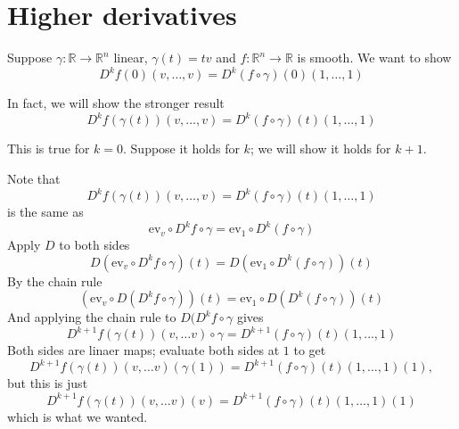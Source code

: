 \documentclass[12pt]{article}
\newcommand{\R}{\mathbb{R}}
\begin{document}
\section*{Higher derivatives}

Suppose $\gamma : \R \to \R^n$ linear, $\gamma(t) = tv$ and $f : \R^n
\to \R$ is smooth.  We want to show
$$
D^k f (0)(v,\ldots,v) = D^k (f \circ \gamma)(0)(1,\ldots,1)
$$

In fact, we will show the stronger result
$$
D^k f (\gamma(t))(v,\ldots,v) = D^k (f \circ \gamma)(t)(1,\ldots,1)
$$

This is true for $k = 0$.  Suppose it holds for $k$; we will show it
holds for $k+1$.

Note that
$$
D^k f (\gamma(t))(v,\ldots,v) = D^k (f \circ \gamma)(t)(1,\ldots,1)
$$
is the same as
$$
\mbox{ev}_v \circ D^k f \circ \gamma = \mbox{ev}_1 \circ D^k (f \circ \gamma)
$$
Apply $D$ to both sides
$$
D(\mbox{ev}_v \circ D^k f \circ \gamma)(t) = D(\mbox{ev}_1 \circ D^k (f \circ \gamma))(t)
$$
By the chain rule
$$
\left( \mbox{ev}_v \circ D(D^k f \circ \gamma) \right)(t) = \mbox{ev}_1 \circ D(D^k (f \circ \gamma))(t)
$$
And applying the chain rule to $D(D^k f \circ \gamma$ gives
$$
D^{k+1} f(\gamma(t))(v,\ldots v) \circ \gamma = D^{k+1} (f \circ \gamma)(t)(1,\ldots,1)
$$
Both sides are linaer maps; evaluate both sides at $1$ to get
$$
D^{k+1} f(\gamma(t))(v,\ldots v)(\gamma(1)) = D^{k+1} (f \circ \gamma)(t)(1,\ldots,1)(1),
$$
but this is just
$$
D^{k+1} f(\gamma(t))(v,\ldots v)(v) = D^{k+1} (f \circ \gamma)(t)(1,\ldots,1)(1)
$$
which is what we wanted.
\end{document}
